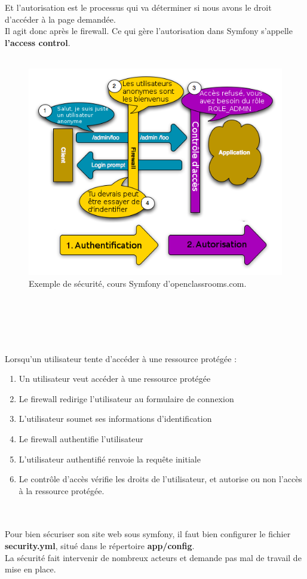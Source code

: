 \documentclass[12pt]{article}
\begin{document}
Et l'autorisation est le processus qui va déterminer si nous avons le droit d'accéder à la page demandée. \\
Il agit donc après le firewall. Ce qui gère l'autorisation dans Symfony s'appelle \textbf{l'access control}.\\
\\
\begin{center}
\begin{figure}[htp]
  \centering
  \includegraphics[width=12cm]{s.png}
  \caption{Exemple de sécurité, cours Symfony d'openclassrooms.com.}
  \label{fig:une-autre-image}
\end{figure} \\ \\
\end{center}
\\
\\
Lorsqu'un utilisateur tente d'accéder à une ressource protégée :
\begin{enumerate}


\item    Un utilisateur veut accéder à une ressource protégée 

 \item    Le firewall redirige l'utilisateur au formulaire de connexion 

  \item   L'utilisateur soumet ses informations d'identification 

 \item    Le firewall authentifie l'utilisateur 

 \item    L'utilisateur authentifié renvoie la requête initiale 

 \item    Le contrôle d'accès vérifie les droits de l'utilisateur, et autorise ou non l'accès à la ressource protégée.
\end{enumerate} \\ 
\\
Pour bien sécuriser son site web  sous symfony, il faut bien configurer le fichier \textbf{security.yml}, situé dans le répertoire \textbf{app/config}.\\
 La sécurité fait intervenir de nombreux acteurs et demande pas mal de travail de mise en place. \\
\end{document}
